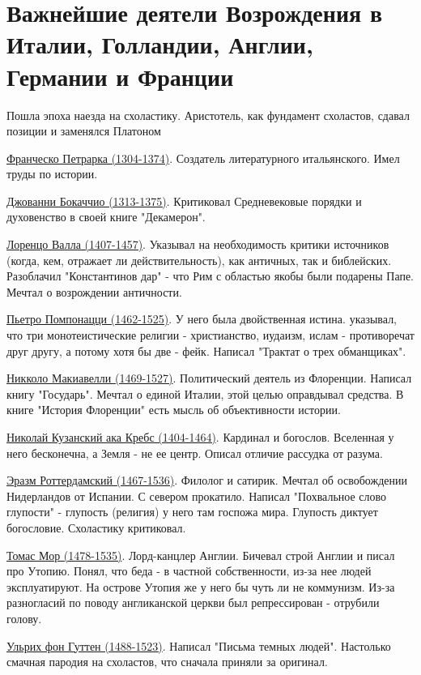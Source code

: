 \section{Важнейшие деятели Возрождения в Италии, Голландии, Англии, Германии и Франции}
Пошла эпоха наезда на схоластику. Аристотель, как фундамент схоластов, сдавал позиции и заменялся Платоном

\underline{Франческо Петрарка (1304-1374)}. 
Создатель литературного итальянского. Имел труды по истории.

\underline{Джованни Бокаччио (1313-1375)}. 
Критиковал Средневековые порядки и духовенство в своей книге "Декамерон". 

\underline{Лоренцо Валла (1407-1457)}. 
Указывал на необходимость критики источников (когда, кем, отражает ли действительность), как античных, так и библейских. Разоблачил "Константинов дар" - что Рим с областью якобы были подарены Папе. Мечтал о возрождении античности.

\underline{Пьетро Помпонацци (1462-1525)}. У него была двойственная истина. указывал, что три монотеистические религии - христианство, иудаизм, ислам - противоречат друг другу, а потому хотя бы две -  фейк. Написал "Трактат о трех обманщиках".

\underline{Никколо Макиавелли (1469-1527)}. Политический деятель из Флоренции. Написал книгу "Государь". Мечтал о единой Италии, этой целью оправдывал средства. В книге "История Флоренции" есть мысль об объективности истории.

\underline{Николай Кузанский ака Кребс (1404-1464)}. Кардинал и богослов. Вселенная у него бесконечна, а Земля - не ее центр. Описал отличие рассудка от разума.

\underline{Эразм Роттердамский (1467-1536)}. Филолог и сатирик. Мечтал об освобождении Нидерландов от Испании. С севером прокатило. Написал "Похвальное слово глупости" - глупость (религия) у него там госпожа мира. Глупость диктует богословие. Схоластику критиковал.

\underline{Томас Мор (1478-1535)}. Лорд-канцлер Англии. Бичевал строй Англии и писал про Утопию. Понял, что беда - в частной собственности, из-за нее людей эксплуатируют. На острове Утопия же у него бы чуть ли не коммунизм. Из-за разногласий по поводу англиканской церкви был репрессирован - отрубили голову.

\underline{Ульрих фон Гуттен (1488-1523)}. Написал "Письма темных людей". Настолько смачная пародия на схоластов, что сначала приняли за оригинал.

